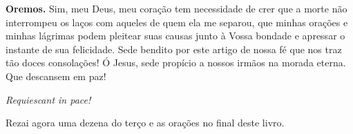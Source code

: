 \vspace{\baselineskip}\noindent \textbf{Oremos.} Sim, meu Deus, meu coração tem necessidade de crer que a morte não
interrompeu os laços com aqueles de quem ela me separou, que minhas orações e minhas lágrimas podem pleitear suas causas junto à Vossa bondade e apressar o instante de sua felicidade. Sede bendito por este artigo de nossa fé que nos traz tão doces consolações! 
Ó Jesus, sede propício a nossos irmãos na morada eterna. Que descansem em paz! 



\begin{center}
\textit{Requiescant in pace!}
\end{center}

Rezai agora uma dezena do terço e as orações no final deste livro.
